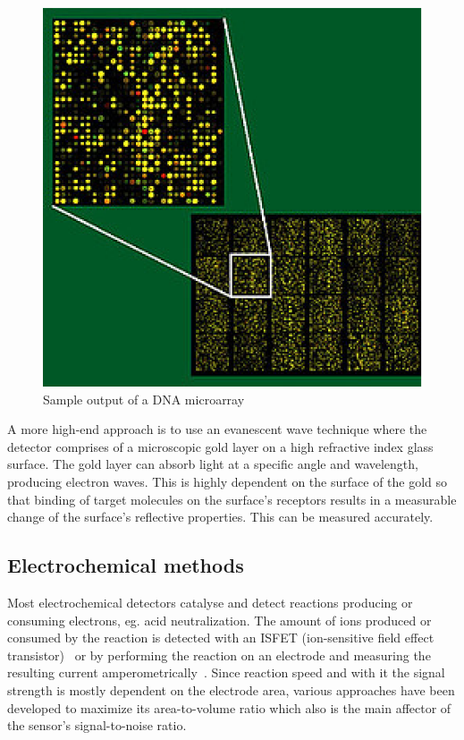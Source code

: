 \documentclass[12pt]{article}
\begin{document}
\begin{figure}[htcb]
\begin{center}
	\includegraphics{dna_microarray.eps}
	\caption{Sample output of a DNA microarray}
	\label{fig:dna_microarray}
\end{center}
\end{figure}


A more high-end approach is to use an evanescent wave technique where the detector 
comprises of a 
microscopic gold layer on a high refractive index glass surface. The gold layer can absorb 
light at a specific angle and wavelength, producing electron waves. This is highly dependent
on the surface of the gold so that binding of target molecules on the surface's receptors 
results in a measurable change of the surface's reflective properties. This can be measured
accurately.~\cite{ZOUROB_2007}

\subsection{Electrochemical methods}
Most electrochemical detectors catalyse and detect reactions producing or consuming 
electrons, eg. acid neutralization. The amount of ions produced or consumed by the 
reaction is detected with an ISFET (ion-sensitive field effect transistor)~\cite{yotter_2004} 
or by performing the reaction on an electrode and measuring the 
resulting current amperometrically~\cite{yotter_2004}. Since reaction speed and with
it the signal strength is mostly
dependent on the electrode area, various approaches have been developed to maximize
its area-to-volume ratio which also is the main affector of the sensor's signal-to-noise
ratio.
\end{document}
